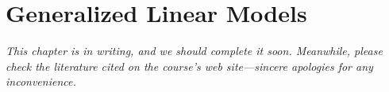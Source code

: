 \chapter{Generalized Linear Models}

{\em This chapter is in writing, and we should complete it soon. Meanwhile, please check the literature cited on the course's web site---sincere apologies for any inconvenience.}